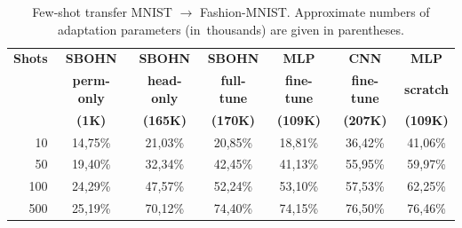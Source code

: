 \begin{table}[htbp]
\centering
\caption{Few-shot transfer MNIST $\to$ Fashion-MNIST. Approximate numbers of adaptation parameters (in~thousands) are given in parentheses.}
\label{tab:fewshot_transfer}
\begin{tabular}{r|c|c|c|c|c|c}
\hline
\textbf{Shots} & \textbf{SBOHN} & \textbf{SBOHN} & \textbf{SBOHN} & \textbf{MLP} & \textbf{CNN} & \textbf{MLP} \\
       & \textbf{perm-only} & \textbf{head-only} & \textbf{full-tune} & \textbf{fine-tune} & \textbf{fine-tune} & \textbf{scratch} \\
       & \textbf{(1K)} & \textbf{(165K)} & \textbf{(170K)} & \textbf{(109K)} & \textbf{(207K)} & \textbf{(109K)} \\
\hline
10  & 14{,}75\% & 21{,}03\% & 20{,}85\% & 18{,}81\% & 36{,}42\% & 41{,}06\% \\
50  & 19{,}40\% & 32{,}34\% & 42{,}45\% & 41{,}13\% & 55{,}95\% & 59{,}97\% \\
100 & 24{,}29\% & 47{,}57\% & 52{,}24\% & 53{,}10\% & 57{,}53\% & 62{,}25\% \\
500 & 25{,}19\% & 70{,}12\% & 74{,}40\% & 74{,}15\% & 76{,}50\% & 76{,}46\% \\
\hline
\end{tabular}
\end{table}

